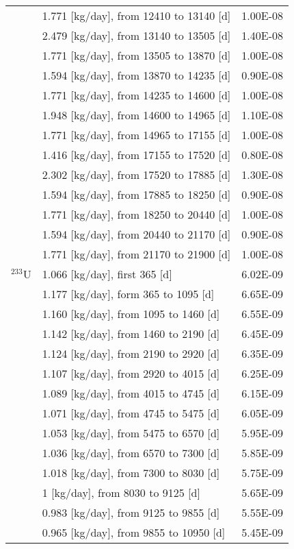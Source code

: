 \begin{longtable}{|p{}|p{}|p{}|}
	&  1.771   [kg/day], from 12410 to 13140 [d]&		1.00E-08	 \\
	&  2.479  [kg/day], from 13140 to 13505 [d]&		1.40E-08	 \\
	&  1.771 [kg/day], from 13505 to 13870 [d]&		1.00E-08	 \\
	& 1.594   [kg/day], from 13870 to 14235 [d]&		0.90E-08	 \\
	&  1.771   [kg/day], from 14235 to 14600 [d]&		1.00E-08	 \\
	& 1.948  [kg/day], from 14600 to 14965 [d]&		1.10E-08	 \\
	&  1.771   [kg/day], from 14965 to 17155 [d]&		1.00E-08	 \\
	&  1.416  [kg/day], from 17155 to 17520 [d]&		0.80E-08	 \\
	&  2.302  [kg/day], from 17520 to 17885 [d]&		1.30E-08	 \\
	& 1.594  [kg/day], from 17885 to 18250 [d]&		0.90E-08	 \\
	&   1.771 [kg/day], from 18250 to 20440 [d]&		1.00E-08	 \\
	&  1.594  [kg/day], from 20440 to 21170 [d]&		0.90E-08	 \\
	&  1.771 [kg/day], from 21170 to 21900 [d]&		1.00E-08	 \\
	\hline
	$^{233}$U &  1.066 [kg/day], first 365  [d]	&   6.02E-09  \\
	& 1.177 [kg/day],  form 365 to 1095 [d] &	6.65E-09 \\
	&  1.160 [kg/day], from 1095 to 1460 [d] &	6.55E-09 \\
	& 1.142   [kg/day], from 1460 to 2190 [d] &	6.45E-09 \\
	& 1.124  [kg/day], from 2190 to 2920 [d] &	6.35E-09 \\
	& 1.107 [kg/day], from 2920 to 4015 [d] &	6.25E-09 \\
	&  1.089 [kg/day], from 4015 to 4745 [d] &	6.15E-09 \\
	&  1.071  [kg/day], from 4745 to 5475 [d] &	6.05E-09 \\
	& 1.053  [kg/day], from 5475 to 6570 [d] &	5.95E-09 \\
	&  1.036  [kg/day], from 6570 to 7300 [d] &	5.85E-09 \\
	&  1.018   [kg/day], from 7300 to 8030 [d] &	5.75E-09 \\
	&  1   [kg/day], from 8030 to 9125 [d] &	5.65E-09 \\
	&  0.983 [kg/day], from 9125 to 9855 [d] &	5.55E-09 \\
	&  0.965  [kg/day], from 9855 to 10950 [d] &	5.45E-09 \\

\end{longtable}
